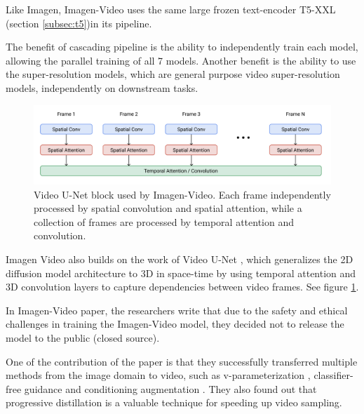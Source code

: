 Like Imagen, Imagen-Video uses the same large frozen text-encoder T5-XXL (section \ref{subsec:t5})in its pipeline.

The benefit of cascading pipeline is the ability to independently train each model, allowing the parallel training of all 7 models. Another benefit is the ability to use the super-resolution models, which are general purpose video super-resolution models, independently on downstream tasks.


\begin{figure}
    \centering
    \includegraphics[width=1\textwidth]{images/imagen_video/video_u_net.png}
    \caption{Video U-Net block \cite{video_diffusion_models} used by Imagen-Video. Each frame independently processed by spatial convolution and spatial attention, while a collection of frames are processed by temporal attention and convolution.}
    \label{fig:imagen_video_video_unet}
\end{figure}


Imagen Video also builds on the work of Video U-Net \cite{video_diffusion_models}, which generalizes the 2D diffusion model architecture to 3D in space-time by using temporal attention and 3D convolution layers to capture dependencies between video frames. See figure \ref{fig:imagen_video_video_unet}.

In Imagen-Video paper, the researchers write that due to the safety and ethical challenges in training the Imagen-Video model, they decided not to release the model to the public (closed source).

One of the contribution of the paper is that they successfully transferred multiple methods from the image domain to video, such as v-parameterization \cite{v_prediction}, classifier-free guidance and conditioning augmentation \cite{cascaded_diffusion_models}. They also found out that progressive distillation \cite{v_prediction} \cite{meng2023distillation} is a valuable technique for speeding up video sampling.














